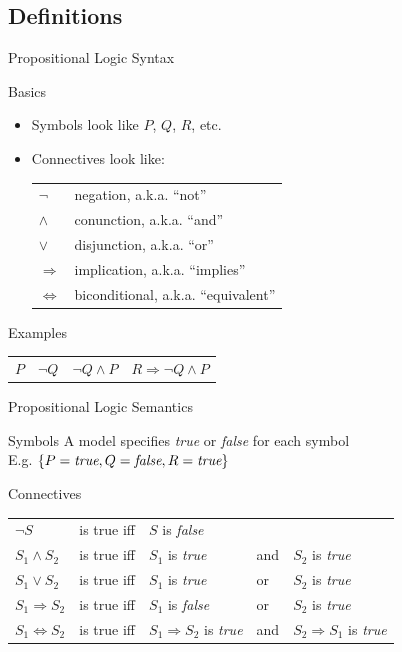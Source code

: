 \documentclass[14pt]{beamer}
\newcommand{\limpl}{\Rightarrow}
\newcommand{\liff}{\Leftrightarrow}
\begin{document}
\subsection{Definitions}
\begin{frame}{Propositional Logic Syntax}
	\begin{block}{Basics}
		\begin{itemize}
			\item Symbols look like $P$, $Q$, $R$, etc.
			\item Connectives look like:\\[0.5em]
				\begin{tabular}{ll}
					$\lnot$  & negation, a.k.a. ``not'' \\
					$\land$  & conunction, a.k.a. ``and'' \\
					$\lor$   & disjunction, a.k.a. ``or'' \\
					$\limpl$ & implication, a.k.a. ``implies'' \\
					$\liff$  & biconditional, a.k.a. ``equivalent''
				\end{tabular}
		\end{itemize}
	\end{block}
	\pause
	\begin{block}{Examples}
		\begin{tabular}{p{.5in}p{.75in}p{1in}p{1in}}
			$P$ \pause &
			$\lnot Q$ \pause &
			$\lnot Q \land P$ \pause &
			$R \limpl \lnot Q \land P$
		\end{tabular}
	\end{block}
\end{frame}
\begin{frame}{Propositional Logic Semantics}
	\begin{block}{Symbols}
		A model specifies \emph{true} or \emph{false} for each symbol \\
		\hspace{1em} E.g. $\{P=\mbox{\em true}, Q=\mbox{\em false}, R=\mbox{\em true}\}$
	\end{block}
	\pause
	\begin{block}{Connectives}
		\small
		\begin{tabular}{@{}lllll}
			$\lnot S$         & is true iff & $S$ is \emph{false} \\
			$S_1 \land S_2$   & is true iff & $S_1$ is \emph{true}            & and & $S_2$ is \emph{true} \\
			$S_1 \lor S_2$    & is true iff & $S_1$ is \emph{true}            & or  & $S_2$ is \emph{true} \\
			$S_1 \limpl S_2$  & is true iff & $S_1$ is \emph{false}           & or  & $S_2$ is \emph{true} \\
			$S_1 \liff S_2$   & is true iff & $S_1 \limpl S_2$ is \emph{true} & and & $S_2 \limpl S_1$ is \emph{true}
		\end{tabular}
	\end{block}
\end{frame}
\end{document}
